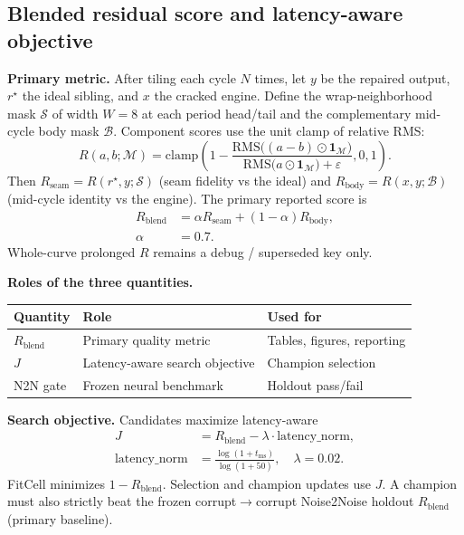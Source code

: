 \subsection{Blended residual score and latency-aware objective}
\label{sec:residual-score}

\textbf{Primary metric.}
After tiling each cycle $N$ times, let $y$ be the repaired output, $r^{\star}$ the ideal sibling, and $x$ the cracked engine.
Define the wrap-neighborhood mask $\mathcal{S}$ of width $W{=}8$ at each period head/tail and the complementary mid-cycle body mask $\mathcal{B}$.
Component scores use the unit clamp of relative RMS:
\begin{equation}
\label{eq:R-component}
R(a,b;\mathcal{M})
=\mathrm{clamp}\!\left(
  1-\frac{\mathrm{RMS}\bigl((a-b)\odot\mathbf{1}_{\mathcal{M}}\bigr)}
         {\mathrm{RMS}\bigl(a\odot\mathbf{1}_{\mathcal{M}}\bigr)+\varepsilon},
  0,1\right).
\end{equation}
Then $R_{\mathrm{seam}}=R(r^{\star},y;\mathcal{S})$ (seam fidelity vs the ideal) and
$R_{\mathrm{body}}=R(x,y;\mathcal{B})$ (mid-cycle identity vs the engine).
The primary reported score is
\begin{equation}
\label{eq:R-blend}
\begin{aligned}
R_{\mathrm{blend}}
&=\alpha R_{\mathrm{seam}}+(1-\alpha)R_{\mathrm{body}},\\
\alpha&=0.7.
\end{aligned}
\end{equation}
Whole-curve prolonged $R$ remains a debug / superseded key only.

\textbf{Roles of the three quantities.}
\begin{center}
\small
\begin{tabular}{@{}lll@{}}
\toprule
Quantity & Role & Used for \\
\midrule
$R_{\mathrm{blend}}$ & Primary quality metric & Tables, figures, reporting \\
$J$ & Latency-aware search objective & Champion selection \\
N2N gate & Frozen neural benchmark & Holdout pass/fail \\
\bottomrule
\end{tabular}
\end{center}

\textbf{Search objective.}
Candidates maximize latency-aware
\begin{equation}
\label{eq:outer-obj}
\begin{aligned}
J&=R_{\mathrm{blend}}-\lambda\cdot\mathrm{latency\_norm},\\
\mathrm{latency\_norm}
&=\frac{\log(1+t_{\mathrm{ms}})}{\log(1+50)},
\quad \lambda=0.02.
\end{aligned}
\end{equation}
FitCell minimizes $1-R_{\mathrm{blend}}$. Selection and champion updates use $J$.
A champion must also strictly beat the frozen corrupt$\to$corrupt Noise2Noise holdout $R_{\mathrm{blend}}$ (primary baseline).

